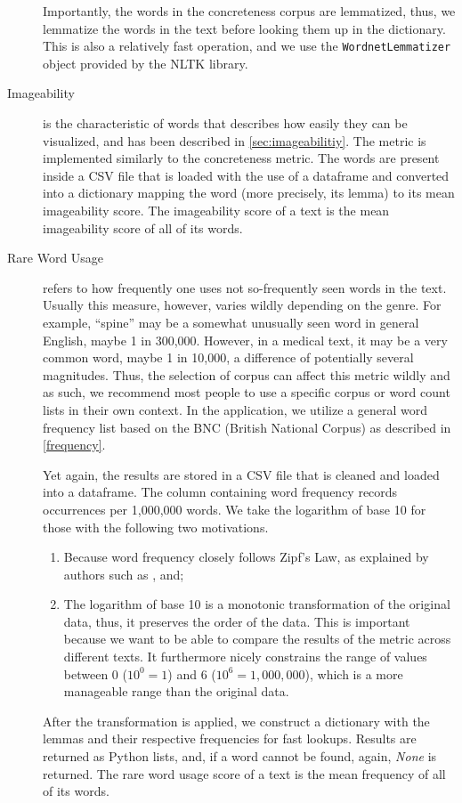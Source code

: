 \begin{description}
    Importantly, the words in the concreteness corpus are lemmatized, thus, we lemmatize the words in the text before looking them up in the dictionary. This is also a relatively fast operation, and we use the \texttt{WordnetLemmatizer} object provided by the NLTK library.
    \item[Imageability] is the characteristic of words that describes how easily they can be visualized, and has been described in \ref{sec:imageabilitiy}. The metric is implemented similarly to the concreteness metric. The words are present inside a CSV file that is loaded with the use of a dataframe and converted into a dictionary mapping the word (more precisely, its lemma) to its mean imageability score. The imageability score of a text is the mean imageability score of all of its words.
    \item[Rare Word Usage] refers to how frequently one uses not so-frequently seen words in the text. Usually this measure, however, varies wildly depending on the genre. For example, ``spine'' may be a somewhat unusually seen word in general English, maybe 1 in 300,000. However, in a medical text, it may be a very common word, maybe 1 in 10,000, a difference of potentially several magnitudes. Thus, the selection of corpus can affect this metric wildly and as such, we recommend most people to use a specific corpus or word count lists in their own context. In the application, we utilize a general word frequency list based on the BNC (British National Corpus) as described in \ref{frequency}. 
    
    Yet again, the results are stored in a CSV file that is cleaned and loaded into a dataframe. The column containing word frequency records occurrences per 1,000,000 words. We take the logarithm of base 10 for those with the following two motivations. 
    \begin{enumerate}
        \item Because word frequency closely follows Zipf's Law, as explained by authors such as \cite{powers1998zipf}, and;
        \item The logarithm of base 10 is a monotonic transformation of the original data, thus, it preserves the order of the data. This is important because we want to be able to compare the results of the metric across different texts. It furthermore nicely constrains the range of values between 0 ($10^0=1$) and 6 ($10^6=1,000,000$), which is a more manageable range than the original data.
    \end{enumerate}

    After the transformation is applied, we construct a dictionary with the lemmas and their respective frequencies for fast lookups. Results are returned as Python lists, and, if a word cannot be found, again, \textit{None} is returned. The rare word usage score of a text is the mean frequency of all of its words.
\end{description}


